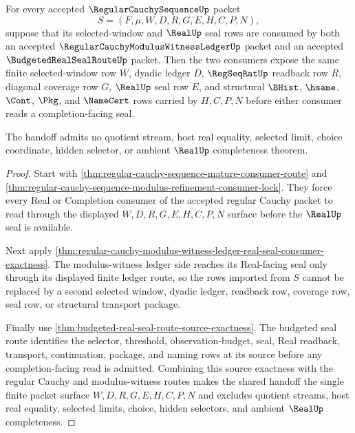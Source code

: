\begin{theorem}
\label{thm:regular-cauchy-sequence-budgeted-modulus-witness-handoff}
For every accepted $\RegularCauchySequenceUp$ packet
$$
S=(F,\mu,W,D,R,G,E,H,C,P,N),
$$
suppose that its selected-window and $\RealUp$ seal rows are consumed by both an accepted $\RegularCauchyModulusWitnessLedgerUp$ packet and an accepted $\BudgetedRealSealRouteUp$ packet. Then the two consumers expose the same finite selected-window row $W$, dyadic ledger $D$, $\RegSeqRatUp$ readback row $R$, diagonal coverage row $G$, $\RealUp$ seal row $E$, and structural $\BHist$, $\hsame$, $\Cont$, $\Pkg$, and $\NameCert$ rows carried by $H,C,P,N$ before either consumer reads a completion-facing seal.

The handoff admits no quotient stream, host real equality, selected limit, choice coordinate, hidden selector, or ambient $\RealUp$ completeness theorem.
\end{theorem}
\begin{proof}
Start with \autoref{thm:regular-cauchy-sequence-mature-consumer-route} and \autoref{thm:regular-cauchy-sequence-modulus-refinement-consumer-lock}. They force every Real or Completion consumer of the accepted regular Cauchy packet to read through the displayed $W,D,R,G,E,H,C,P,N$ surface before the $\RealUp$ seal is available.

Next apply \autoref{thm:regular-cauchy-modulus-witness-ledger-real-seal-consumer-exactness}. The modulus-witness ledger side reaches its Real-facing seal only through its displayed finite ledger route, so the rows imported from $S$ cannot be replaced by a second selected window, dyadic ledger, readback row, coverage row, seal row, or structural transport package.

Finally use \autoref{thm:budgeted-real-seal-route-source-exactness}. The budgeted seal route identifies the selector, threshold, observation-budget, seal, Real readback, transport, continuation, package, and naming rows at its source before any completion-facing read is admitted. Combining this source exactness with the regular Cauchy and modulus-witness routes makes the shared handoff the single finite packet surface $W,D,R,G,E,H,C,P,N$ and excludes quotient streams, host real equality, selected limits, choice, hidden selectors, and ambient $\RealUp$ completeness.
\end{proof}


